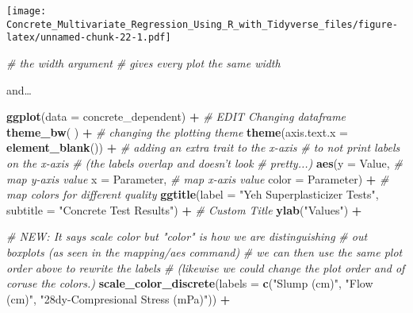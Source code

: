 \documentclass[]{article}
\newenvironment{Shaded}{\begin{snugshade}}{\end{snugshade}}
\newcommand{\CommentTok}[1]{\textcolor[rgb]{0.56,0.35,0.01}{\textit{#1}}}
\newcommand{\DataTypeTok}[1]{\textcolor[rgb]{0.13,0.29,0.53}{#1}}
\newcommand{\KeywordTok}[1]{\textcolor[rgb]{0.13,0.29,0.53}{\textbf{#1}}}
\newcommand{\NormalTok}[1]{#1}
\newcommand{\OperatorTok}[1]{\textcolor[rgb]{0.81,0.36,0.00}{\textbf{#1}}}
\newcommand{\StringTok}[1]{\textcolor[rgb]{0.31,0.60,0.02}{#1}}
\begin{document}
\texttt{[image: Concrete\_Multivariate\_Regression\_Using\_R\_with\_Tidyverse\_files/figure-latex/unnamed-chunk-22-1.pdf]}

\begin{Shaded}
\begin{Highlighting}[]
                             \CommentTok{#   the width argument }
                             \CommentTok{# gives every plot the same width}
\end{Highlighting}
\end{Shaded}

and\ldots{}

\begin{Shaded}
\begin{Highlighting}[]
\KeywordTok{ggplot}\NormalTok{(}\DataTypeTok{data =}\NormalTok{ concrete_dependent) }\OperatorTok{+}\StringTok{      }\CommentTok{# EDIT Changing dataframe}
\StringTok{  }
\StringTok{  }\KeywordTok{theme_bw}\NormalTok{( ) }\OperatorTok{+}\StringTok{                            }\CommentTok{# changing the plotting theme}
\StringTok{  }
\StringTok{  }\KeywordTok{theme}\NormalTok{(}\DataTypeTok{axis.text.x =} \KeywordTok{element_blank}\NormalTok{()) }\OperatorTok{+}\StringTok{   }\CommentTok{# adding an extra trait to the x-axis}
\StringTok{                                           }\CommentTok{# to not print labels on the x-axis }
\StringTok{                                           }\CommentTok{# (the labels overlap and doesn't look}
\StringTok{                                           }\CommentTok{# pretty...)}
\StringTok{  }
\StringTok{  }\KeywordTok{aes}\NormalTok{(}\DataTypeTok{y      =}\NormalTok{ Value,                     }\CommentTok{# map y-axis value}
      \DataTypeTok{x      =}\NormalTok{ Parameter,                 }\CommentTok{# map x-axis value}
      \DataTypeTok{color  =}\NormalTok{ Parameter) }\OperatorTok{+}\StringTok{               }\CommentTok{# map colors for different quality}
\StringTok{  }
\StringTok{  }\KeywordTok{ggtitle}\NormalTok{(}\DataTypeTok{label    =} \StringTok{"Yeh Superplasticizer Tests"}\NormalTok{,}
          \DataTypeTok{subtitle =} \StringTok{"Concrete Test Results"}\NormalTok{) }\OperatorTok{+}\StringTok{ }\CommentTok{# Custom Title}
\StringTok{  }
\StringTok{  }\KeywordTok{ylab}\NormalTok{(}\StringTok{"Values"}\NormalTok{) }\OperatorTok{+}

\StringTok{  }\CommentTok{# NEW: It says scale color but "color" is how we are distinguishing}
\StringTok{  }\CommentTok{#      out boxplots (as seen in the mapping/aes command)}
\StringTok{  }\CommentTok{#      we can then use the same plot order above to rewrite the labels}
\StringTok{  }\CommentTok{#      (likewise we could change the plot order and of coruse the colors.)}
\StringTok{  }\KeywordTok{scale_color_discrete}\NormalTok{(}\DataTypeTok{labels =} \KeywordTok{c}\NormalTok{(}\StringTok{"Slump (cm)"}\NormalTok{,}
                                  \StringTok{"Flow (cm)"}\NormalTok{, }
                                  \StringTok{"28dy-Compresional Stress (mPa)"}\NormalTok{)) }\OperatorTok{+}\StringTok{ }
\StringTok{  }


\end{Highlighting}
\end{Shaded}
\end{document}
